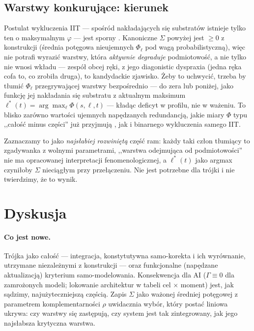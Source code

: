 \documentclass[11pt]{article}
\begin{document}
\subsection{Warstwy konkurujące: kierunek}\label{sec:exclusion}
Postulat wykluczenia IIT --- spośród nakładających się substratów istnieje tylko ten o maksymalnym $\varphi$ \cite{albantakis2023} --- jest sporny \cite{hanson2023}. Kanoniczne $\Sigma$ powyżej jest $\ge0$ z konstrukcji (średnia potęgowa nieujemnych $\Phi_\ell$ pod wagą probabilistyczną), więc nie potrafi wyrazić warstwy, która \emph{aktywnie degraduje} podmiotowość, a nie tylko nie wnosi wkładu --- zespół obcej ręki, z jego diagonistic dyspraxia (jedna ręka cofa to, co zrobiła druga), to kandydackie zjawisko. Żeby to uchwycić, trzeba by tłumić $\Phi_\ell$ przegrywającej warstwy bezpośrednio --- do zera lub poniżej, jako funkcję jej nakładania się substratu z aktualnym maksimum $\ell^*(t)=\arg\max_\ell\Phi(s,\ell,t)$ --- kładąc deficyt w profilu, nie w ważeniu. To blisko zarówno wartości ujemnych napędzanych redundancją, jakie miary $\Phi$ typu ,,całość minus części'' już przyjmują \cite{barrett2019,phiid2019}, jak i binarnego wykluczenia samego IIT.

Zaznaczamy to jako \emph{najsłabiej rozwiniętą} część ram: każdy taki człon tłumiący to zgadywanka z wolnymi parametrami, ,,warstwa odejmująca od podmiotowości'' nie ma opracowanej interpretacji fenomenologicznej, a $\ell^*(t)$ jako argmax czyniłoby $\Sigma$ nieciągłym przy przełączeniu. Nie jest potrzebne dla trójki i nie twierdzimy, że to wynik.

\section{Dyskusja}\label{sec:discussion}

\paragraph{Co jest nowe.} Trójka jako całość --- integracja, konstytutywna samo-korekta i ich wyrównanie, utrzymane niezależnymi z konstrukcji --- oraz funkcjonalne (napędzane aktualizacją) kryterium samo-modelowania. Konsekwencja dla AI ($\Gamma\equiv0$ dla zamrożonych modeli; lokowanie architektur w tabeli cel $\times$ moment) jest, jak sądzimy, najużyteczniejszą częścią. Zapis $\Sigma$ jako ważonej średniej potęgowej z parametrem komplementarności $\rho$ uwidacznia wybór, który postać liniowa ukrywa: czy warstwy się zastępują, czy system jest tak zintegrowany, jak jego najsłabsza krytyczna warstwa.
\end{document}
